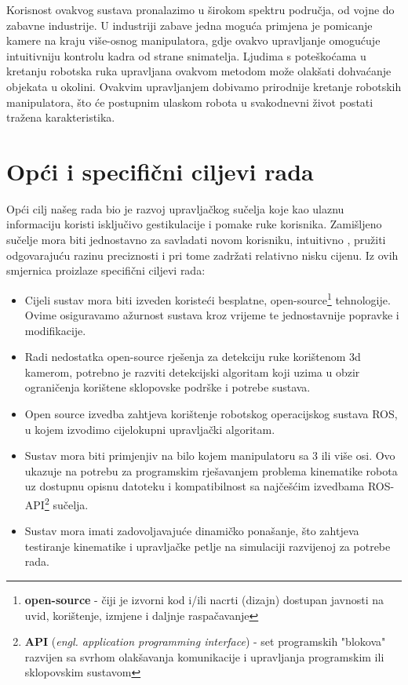 \documentclass[times, utf8, diplomski, numeric]{fer}
\begin{document}
Korisnost ovakvog sustava pronalazimo u širokom spektru područja, od vojne do zabavne industrije. 
U industriji zabave jedna moguća primjena je pomicanje kamere na kraju više-osnog manipulatora, gdje ovakvo upravljanje omogućuje intuitivniju kontrolu kadra od strane snimatelja.
Ljudima s poteškoćama u kretanju robotska ruka upravljana ovakvom metodom može olakšati dohvaćanje objekata u okolini. 
Ovakvim upravljanjem dobivamo prirodnije kretanje robotskih manipulatora, što će postupnim ulaskom robota u svakodnevni život postati tražena karakteristika.


\section{Opći i specifični ciljevi rada}
Opći cilj našeg rada bio je razvoj upravljačkog sučelja koje kao ulaznu informaciju koristi isključivo gestikulacije i pomake ruke korisnika.
Zamišljeno sučelje mora biti jednostavno za savladati novom korisniku, intuitivno , pružiti odgovarajuću razinu preciznosti i pri tome zadržati relativno nisku cijenu.
Iz ovih smjernica proizlaze specifični ciljevi rada:
\begin{itemize}
\item Cijeli sustav mora biti izveden koristeći besplatne, open-source\footnote{\textbf{open-source} - čiji je izvorni kod i/ili nacrti (dizajn) dostupan javnosti na uvid, korištenje, izmjene i daljnje raspačavanje} tehnologije. 
Ovime osiguravamo ažurnost sustava kroz vrijeme te jednostavnije popravke i modifikacije.
\item Radi nedostatka open-source rješenja za detekciju ruke korištenom 3d kamerom, potrebno je razviti detekcijski algoritam koji uzima u obzir ograničenja korištene sklopovske podrške i potrebe sustava.
\item Open source izvedba zahtjeva korištenje robotskog operacijskog sustava ROS, u kojem izvodimo cijelokupni upravljački algoritam.
\item Sustav mora biti primjenjiv na bilo kojem manipulatoru sa 3 ili više osi. Ovo ukazuje na potrebu za programskim rješavanjem problema kinematike robota uz dostupnu opisnu datoteku i kompatibilnost sa najčešćim izvedbama ROS-API\footnote{\textbf{API} (\textit{engl. application programming interface}) - set programskih "blokova" razvijen sa svrhom olakšavanja komunikacije i upravljanja programskim ili sklopovskim sustavom} sučelja.
\item Sustav mora imati zadovoljavajuće dinamičko ponašanje, što zahtjeva testiranje kinematike i upravljačke petlje na simulaciji razvijenoj za potrebe rada.
\end{itemize}
\end{document}
